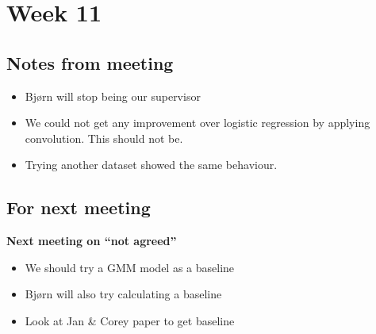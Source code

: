 
\section{Week 11}

\subsection{Notes from meeting}

\begin{itemize}
\item Bjørn will stop being our supervisor
\item We could not get any improvement over logistic regression by applying convolution. This should not be.
\item Trying another dataset showed the same behaviour.
\end{itemize}

\subsection{For next meeting}

\textbf{Next meeting on ``not agreed''}

\begin{itemize}
\item We should try a GMM model as a baseline
\item Bjørn will also try calculating a baseline
\item Look at Jan & Corey paper to get baseline
\end{itemize}
